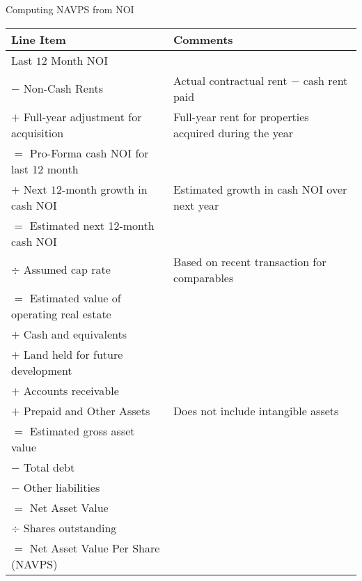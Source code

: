 \begin{flushleft}
Computing NAVPS from NOI
\begin{tabularx}{\textwidth}{X|p{25em}}
\hline
\rowcolor{gray!30}
Line Item & Comments \\
\hline
Last $12$ Month NOI & \\
$-$ Non-Cash Rents & Actual contractual rent $-$ cash rent paid \\
$+$ Full-year adjustment for acquisition & Full-year rent for properties acquired during the year \\
$=$ Pro-Forma cash NOI for last 12 month & \\
\hline
$+$ Next $12$-month growth in cash NOI & Estimated growth in cash NOI over next year \\
$=$ Estimated next 12-month cash NOI & \\
\hline
$\div$ Assumed cap rate & Based on recent transaction for comparables \\
$=$ Estimated value of operating real estate & \\
\hline
$+$ Cash and equivalents & \\
$+$ Land held for future development & \\
$+$ Accounts receivable & \\
$+$ Prepaid and Other Assets & Does not include intangible assets \\
$=$ Estimated gross asset value & \\
\hline
$-$ Total debt & \\
$-$ Other liabilities & \\
$=$ Net Asset Value & \\
\hline
$\div$ Shares outstanding & \\
$=$ Net Asset Value Per Share (NAVPS) & \\
\hline
\end{tabularx}
\end{flushleft}

